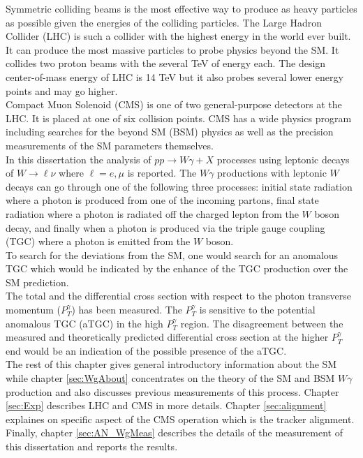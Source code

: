 Symmetric colliding beams is the most effective way to produce as heavy particles as possible given the energies of the colliding particles. The Large Hadron Collider (LHC) is such a collider with the highest energy in the world ever built. It can produce the most massive particles to probe physics beyond the SM. It collides two proton beams with the several TeV of energy each. The design center-of-mass energy of LHC is 14 TeV but it also probes several lower energy points and may go higher. \\

Compact Muon Solenoid (CMS) is one of two general-purpose detectors at the LHC. It is placed at one of six collision points. CMS has a wide physics program including searches for the beyond SM (BSM) physics as well as the precision measurements of the SM parameters themselves.\\

In this dissertation the analysis of $pp\rightarrow W\gamma + X$  processes using  leptonic decays of $W\to \ell\nu$ where $\ell = e, \mu$ is reported. The $W\gamma$ productions with leptonic $W$ decays can go through one of the following three processes: initial state radiation where a photon is produced from one of the incoming partons, final state radiation where a photon is radiated off the charged lepton from the $W$ boson decay, and finally when a photon is produced via the triple gauge coupling (TGC) where a photon is emitted from the $W$ boson. \\ 

To search for the deviations from the SM, one would search for an anomalous TGC which would be indicated by the enhance of the TGC production over the SM prediction. \\

The total and the differential cross section with respect to the photon transverse momentum ($P_T^\gamma$) has been measured. The $P_T^{\gamma}$ is sensitive to the potential anomalous TGC (aTGC) in the high $P_T^{\gamma}$ region. The disagreement between the measured and theoretically predicted differential cross section at the higher $P_T^{\gamma}$ end would be an indication of the possible presence of the aTGC. \\

The rest of this chapter gives general introductory information about the SM while chapter \ref{sec:WgAbout} concentrates on the theory of the SM and BSM $W\gamma$ production and also discusses previous measurements of this process. Chapter \ref{sec:Exp} describes LHC and CMS in more details. Chapter \ref{sec:alignment} explaines on specific aspect of the CMS operation which is the tracker alignment. Finally, chapter \ref{sec:AN_WgMeas} describes the details of the measurement of this dissertation and reports the results.\\ 



%
%
%
%
%
%
